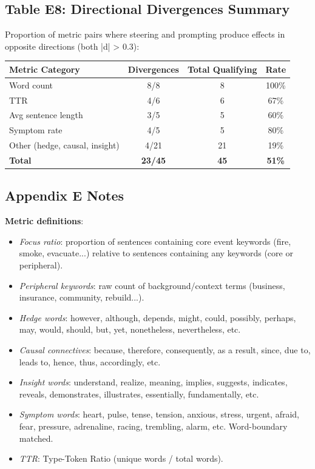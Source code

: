 \documentclass[11pt,a4paper]{article}
\begin{document}
\subsection*{Table E8: Directional Divergences Summary}

Proportion of metric pairs where steering and prompting produce effects in opposite directions (both |d| > 0.3):

\begin{center}
\begin{tabular}{lccc}
\toprule
Metric Category & Divergences & Total Qualifying & Rate \\
\midrule
Word count & 8/8 & 8 & 100\% \\
TTR & 4/6 & 6 & 67\% \\
Avg sentence length & 3/5 & 5 & 60\% \\
Symptom rate & 4/5 & 5 & 80\% \\
Other (hedge, causal, insight) & 4/21 & 21 & 19\% \\
\textbf{Total} & \textbf{23/45} & \textbf{45} & \textbf{51\%} \\
\bottomrule
\end{tabular}
\end{center}

\subsection*{Appendix E Notes}

\textbf{Metric definitions}:

\begin{itemize}[leftmargin=*]
  \item \emph{Focus ratio}: proportion of sentences containing core event keywords (fire, smoke, evacuate...) relative to sentences containing any keywords (core or peripheral).
  \item \emph{Peripheral keywords}: raw count of background/context terms (business, insurance, community, rebuild...).
  \item \emph{Hedge words}: however, although, depends, might, could, possibly, perhaps, may, would, should, but, yet, nonetheless, nevertheless, etc.
  \item \emph{Causal connectives}: because, therefore, consequently, as a result, since, due to, leads to, hence, thus, accordingly, etc.
  \item \emph{Insight words}: understand, realize, meaning, implies, suggests, indicates, reveals, demonstrates, illustrates, essentially, fundamentally, etc.
  \item \emph{Symptom words}: heart, pulse, tense, tension, anxious, stress, urgent, afraid, fear, pressure, adrenaline, racing, trembling, alarm, etc. Word-boundary matched.
  \item \emph{TTR}: Type-Token Ratio (unique words / total words).
\end{itemize}
\end{document}
